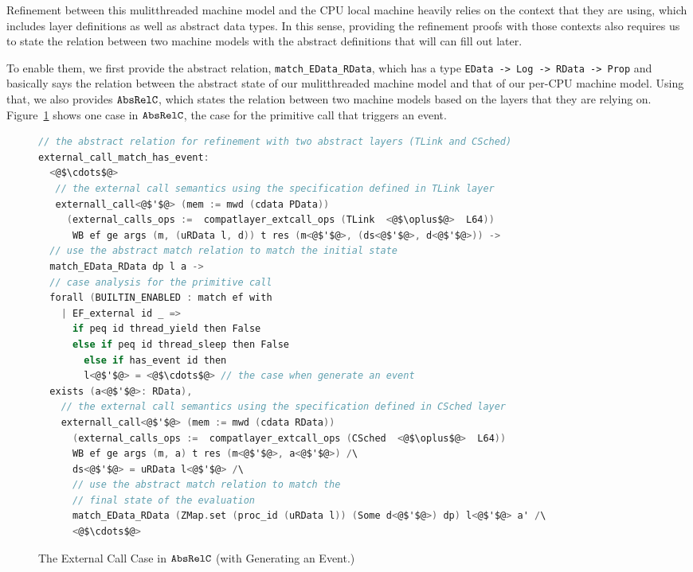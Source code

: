 Refinement between this mulitthreaded machine model and the CPU local machine heavily relies on
the context that they are using, 
which includes  layer definitions as well as  abstract data types.
In this sense, providing the refinement proofs with 
those contexts
also requires us to 
state the relation between two machine models 
with the abstract definitions that will can fill out later.

To enable them, 
we first provide the abstract relation, \lstinline$match_EData_RData$,
which has a type \lstinline$EData -> Log -> RData -> Prop$ and 
basically says the 
relation between the abstract state of our mulitthreaded machine model and 
that of our per-CPU machine model.
Using that, we also provides ${\mathrm{\texttt{AbsRelC}}}$,
which states the relation between two machine models based on the layers that they are relying on.
Figure~\ref{fig:chapter:conlink:two-cases-of-abs-rel-c} shows one case in ${\mathrm{\texttt{AbsRelC}}}$,
the case for the primitive call that triggers an event.  

\begin{figure}
\begin{lstlisting}[language=C]     
// the abstract relation for refinement with two abstract layers (TLink and CSched)
external_call_match_has_event:
  <@$\cdots$@>
   // the external call semantics using the specification defined in TLink layer
   externall_call<@$'$@> (mem := mwd (cdata PData)) 
     (external_calls_ops :=  compatlayer_extcall_ops (TLink  <@$\oplus$@>  L64))
      WB ef ge args (m, (uRData l, d)) t res (m<@$'$@>, (ds<@$'$@>, d<@$'$@>)) ->
  // use the abstract match relation to match the initial state
  match_EData_RData dp l a ->
  // case analysis for the primitive call
  forall (BUILTIN_ENABLED : match ef with
    | EF_external id _ => 
      if peq id thread_yield then False
      else if peq id thread_sleep then False
        else if has_event id then
        l<@$'$@> = <@$\cdots$@> // the case when generate an event   
  exists (a<@$'$@>: RData),
    // the external call semantics using the specification defined in CSched layer  
    externall_call<@$'$@> (mem := mwd (cdata RData)) 
      (external_calls_ops :=  compatlayer_extcall_ops (CSched  <@$\oplus$@>  L64))
      WB ef ge args (m, a) t res (m<@$'$@>, a<@$'$@>) /\
      ds<@$'$@> = uRData l<@$'$@> /\
      // use the abstract match relation to match the 
      // final state of the evaluation
      match_EData_RData (ZMap.set (proc_id (uRData l)) (Some d<@$'$@>) dp) l<@$'$@> a' /\
      <@$\cdots$@>
\end{lstlisting}
\caption{The External Call Case in ${\mathrm{\texttt{AbsRelC}}}$ (with Generating an Event.)}
\label{fig:chapter:conlink:two-cases-of-abs-rel-c}
\end{figure}




